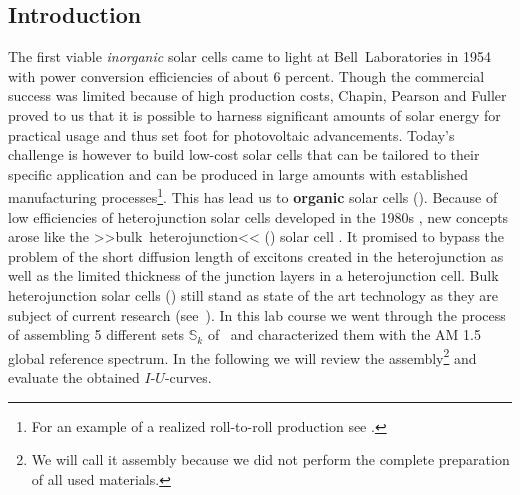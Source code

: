 \documentclass[a4paper,10pt,twocolumn]{article}
\begin{document}
\begin{extract*}
	
\section*{Introduction}%

The first viable \textit{inorganic} solar cells came to light at Bell~Laboratories in 1954 \cite{siliconSC_1}\cite{siliconSC_2} with power conversion efficiencies of about 6 percent. Though the commercial success was limited because of high production costs, Chapin, Pearson and Fuller proved to us that it is possible to harness significant amounts of solar energy for practical usage and thus set foot for photovoltaic advancements.\mypar
Today's challenge is however to build low-cost solar cells that can be tailored to their specific application and can be produced in large amounts with established manufacturing processes\footnote{For an example of a realized roll-to-roll production see \cite{rolltoroll}.}. This has lead us to \textbf{organic} solar cells (\OSC).\mypar
Because of low efficiencies of heterojunction solar cells developed in the 1980s \cite{tang}, new concepts arose like the >>bulk~heterojunction<< (\BHJ) solar cell \cite{heterojunk}. It promised to bypass the problem of the short diffusion length of excitons created in the heterojunction as well as the limited thickness of the junction layers in a heterojunction cell.\mypar
Bulk heterojunction solar cells (\BHSC) still stand as state of the art technology as they are subject of current research (see~\cite{modernbulkhetero}). In this lab course we went through the process of assembling 5 different sets $\mathbb{S}_k$ of \BHSC\ and characterized them with the {\os\sefo AM 1.5} global reference spectrum. In the following we will review the assembly\footnote{We will call it assembly because we did not perform the complete preparation of all used materials.} and evaluate the obtained $I$-$U$-curves.


\end{extract*}
\end{document}
